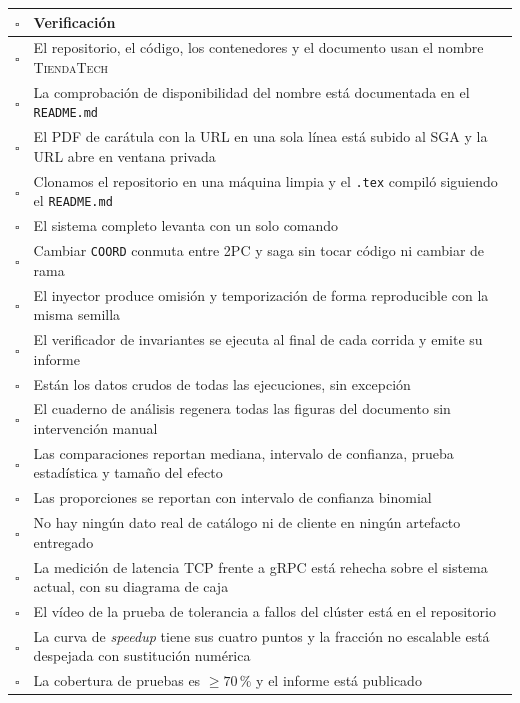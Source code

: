 \documentclass[11pt,a4paper]{article}
\begin{document}
	\begin{center}
		\small
		\begin{longtable}{@{}p{0.7cm}p{14.2cm}@{}}
			\toprule
			\textbf{$\square$} & \textbf{Verificación} \\
			\midrule
			\endhead
			$\square$ & El repositorio, el código, los contenedores y el documento usan el nombre \textsc{TiendaTech} \\
			$\square$ & La comprobación de disponibilidad del nombre está documentada en el \texttt{README.md} \\
			$\square$ & El PDF de carátula con la URL en una sola línea está subido al SGA y la URL abre en ventana privada \\
			$\square$ & Clonamos el repositorio en una máquina limpia y el \texttt{.tex} compiló siguiendo el \texttt{README.md} \\
			$\square$ & El sistema completo levanta con un solo comando \\
			$\square$ & Cambiar \texttt{COORD} conmuta entre 2PC y saga sin tocar código ni cambiar de rama \\
			$\square$ & El inyector produce omisión y temporización de forma reproducible con la misma semilla \\
			$\square$ & El verificador de invariantes se ejecuta al final de cada corrida y emite su informe \\
			$\square$ & Están los datos crudos de todas las ejecuciones, sin excepción \\
			$\square$ & El cuaderno de análisis regenera todas las figuras del documento sin intervención manual \\
			$\square$ & Las comparaciones reportan mediana, intervalo de confianza, prueba estadística y tamaño del efecto \\
			$\square$ & Las proporciones se reportan con intervalo de confianza binomial \\
			$\square$ & No hay ningún dato real de catálogo ni de cliente en ningún artefacto entregado \\
			$\square$ & La medición de latencia TCP frente a gRPC está rehecha sobre el sistema actual, con su diagrama de caja \\
			$\square$ & El vídeo de la prueba de tolerancia a fallos del clúster está en el repositorio \\
			$\square$ & La curva de \emph{speedup} tiene sus cuatro puntos y la fracción no escalable está despejada con sustitución numérica \\
			$\square$ & La cobertura de pruebas es $\geq 70\,\%$ y el informe está publicado \\

\end{longtable}
\end{center}
\end{document}
